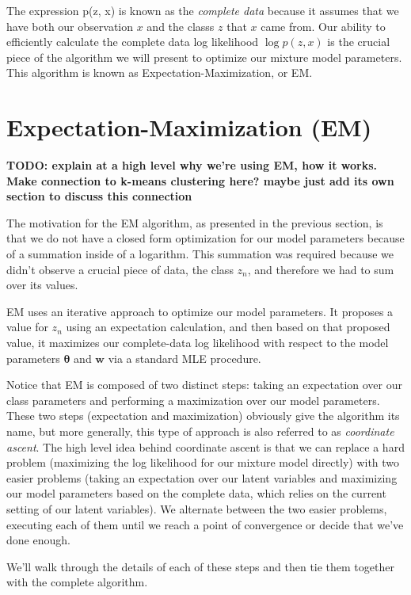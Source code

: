The expression p(z, x) is known as the \textit{complete data} because it assumes that we have both our observation $x$ and the classs $z$ that $x$ came from. Our ability to efficiently calculate the complete data log likelihood $\log p(z, x)$ is the crucial piece of the algorithm we will present to optimize our mixture model parameters. This algorithm is known as Expectation-Maximization, or EM.

\section{Expectation-Maximization (EM)}
\textbf{TODO: explain at a high level why we're using EM, how it works. Make connection to k-means clustering here? maybe just add its own section to discuss this connection}

The motivation for the EM algorithm, as presented in the previous section, is that we do not have a closed form optimization for our model parameters because of a summation inside of a logarithm. This summation was required because we didn't observe a crucial piece of data, the class $z_{n}$, and therefore we had to sum over its values.

EM uses an iterative approach to optimize our model parameters. It proposes a value for $z_{n}$ using an expectation calculation, and then based on that proposed value, it maximizes our complete-data log likelihood with respect to the model parameters $\boldsymbol{\theta}$ and $\textbf{w}$ via a standard MLE procedure.

Notice that EM is composed of two distinct steps: taking an expectation over our class parameters and performing a maximization over our model parameters. These two steps (expectation and maximization) obviously give the algorithm its name, but more generally, this type of approach is also referred to as \textit{coordinate ascent}. The high level idea behind coordinate ascent is that we can replace a hard problem (maximizing the log likelihood for our mixture model directly) with two easier problems (taking an expectation over our latent variables and maximizing our model parameters based on the complete data, which relies on the current setting of our latent variables). We alternate between the two easier problems, executing each of them until we reach a point of convergence or decide that we've done enough.

We'll walk through the details of each of these steps and then tie them together with the complete algorithm.

